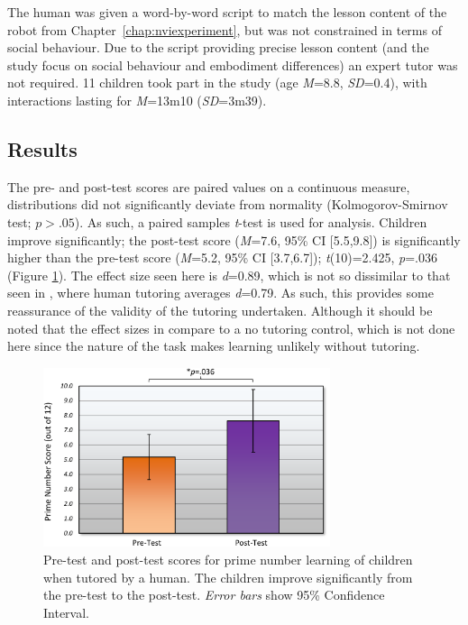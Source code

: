 The human was given a word-by-word script to match the lesson content of the robot from Chapter~\ref{chap:nviexperiment}, but was not constrained in terms of social behaviour. Due to the script providing precise lesson content (and the study focus on social behaviour and embodiment differences) an expert tutor was not required. 11 children took part in the study (age \textit{M}=8.8, \textit{SD}=0.4), with interactions lasting for \textit{M}=13m10 (\textit{SD}=3m39).

\subsection{Results}
The pre- and post-test scores are paired values on a continuous measure, distributions did not significantly deviate from normality (Kolmogorov-Smirnov test; $\textit{p}>.05$). As such, a paired samples \textit{t}-test is used for analysis. Children improve significantly; the post-test score (\textit{M}=7.6, 95\% CI [5.5,9.8]) is significantly higher than the pre-test score (\textit{M}=5.2, 95\% CI [3.7,6.7]); \textit{t}(10)=2.425, \textit{p}=.036 (Figure \ref{fig:ch10_humangraph}). The effect size seen here is \textit{d}=0.89, which is not so dissimilar to that seen in \cite{vanlehn2011relative}, where human tutoring averages \textit{d}=0.79. As such, this provides some reassurance of the validity of the tutoring undertaken. Although it should be noted that the effect sizes in \citet{vanlehn2011relative} compare to a no tutoring control, which is not done here since the nature of the task makes \gls{learning} unlikely without tutoring.

\begin{figure}[t]
    \centering
    \includegraphics[width=0.75\textwidth]{images/ch10_HumanGraph.pdf}
    \caption{Pre-test and post-test scores for prime number learning of children when tutored by a human. The children improve significantly from the pre-test to the post-test. \textit{Error bars} show 95\% Confidence Interval.}
    \label{fig:ch10_humangraph}
\end{figure}


